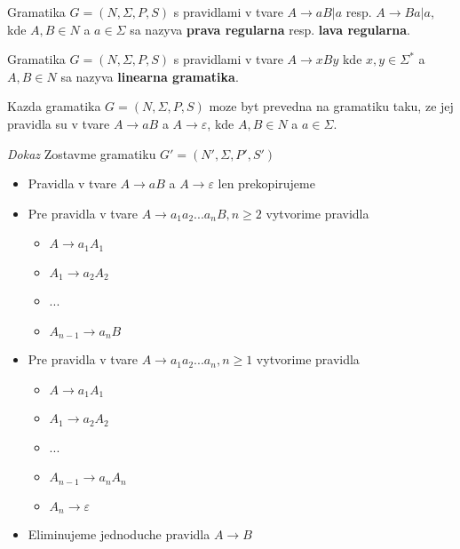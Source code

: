 \documentclass[12pt]{article}
\begin{document}
Gramatika $G = (N,\Sigma,P,S)$ s pravidlami v tvare $A \to aB|a$ resp. $A \to Ba|a$, kde $A,B \in N$
a $a \in \Sigma$ sa nazyva \textbf{prava regularna} resp. \textbf{lava regularna}.

Gramatika $G = (N,\Sigma,P,S)$ s pravidlami v tvare $A \to xBy$ kde $x,y \in \Sigma^{*}$ a $A,B \in N$
sa nazyva \textbf{linearna gramatika}.

Kazda gramatika $G = (N,\Sigma,P,S)$ moze byt prevedna na gramatiku taku, ze jej pravidla su v tvare
$A \to aB$ a $A \to \varepsilon$, kde $A,B \in N$ a $a \in \Sigma$.

\emph{Dokaz} Zostavme gramatiku $G' = (N',\Sigma,P',S')$
\begin{itemize}
	\item Pravidla v tvare $A \to aB$ a $A \to \varepsilon$ len prekopirujeme
	\item Pre pravidla v tvare $A \to a_{1}a_{2}...a_{n}B, n \ge 2$ vytvorime pravidla
		\begin{itemize}
			\item $A \to a_{1}A_{1}$
			\item $A_{1} \to a_{2}A_{2}$
			\item ...
			\item $A_{n-1} \to a_{n}B$
		\end{itemize}
	\item Pre pravidla v tvare $A \to a_{1}a_{2}...a_{n}, n \ge 1$ vytvorime pravidla
		\begin{itemize}
			\item $A \to a_{1}A_{1}$
			\item $A_{1} \to a_{2}A_{2}$
			\item ...
			\item $A_{n-1} \to a_{n}A_{n}$
			\item $A_{n} \to \varepsilon$
		\end{itemize}
	\item Eliminujeme jednoduche pravidla $A \to B$
\end{itemize}
\end{document}
